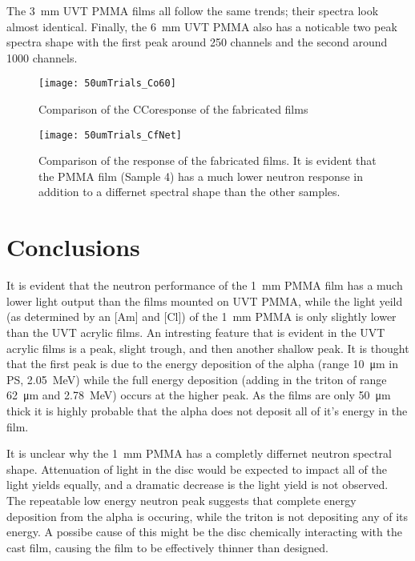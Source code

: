 \documentclass[draftcls,onecolumn]{IEEEtran}
\begin{document}
The \SI{3}{\mm} UVT PMMA films all follow the same trends; their spectra look almost identical.
Finally, the \SI{6}{\mm} UVT PMMA also has a noticable two peak spectra shape with the first peak around 250 channels and the second around 1000 channels.
\begin{figure}[ht]
  \centering
  \texttt{[image: 50umTrials\_Co60]}
  \caption[Fabricated Film Comparison (Gamma)]{Comparison of the \iso[60]C{Co}response of the fabricated films}
  \label{fig:CompCo60}
\end{figure}
\begin{figure}[ht]
  \centering
  \texttt{[image: 50umTrials\_CfNet]}
  \caption[Fabricated Film Comparison (Neutron)]{Comparison of the  response of the fabricated films. It is evident that the PMMA film (Sample 4) has a much lower neutron response in addition to a differnet spectral shape than the other samples.}
  \label{fig:CompCf252}
\end{figure}
\section{Conclusions}
It is evident that the neutron performance of the \SI{1}{\mm} PMMA film has a much lower light output than the films mounted on UVT PMMA, while the light yeild (as determined by an [Am] and [Cl]) of the \SI{1}{\mm} PMMA is only slightly lower than the UVT acrylic films.
An intresting feature that is evident in the UVT acrylic films is a peak, slight trough, and then another shallow peak.
It is thought that the first peak is due to the energy deposition of the alpha (range \SI{10}{\um} in PS, \SI{2.05}{\MeV}) while the full energy deposition (adding in the triton of range \SI{62}{\um} and \SI{2.78}{\MeV}) occurs at the higher peak.
As the films are only \SI{50}{\um} thick it is highly probable that the alpha does not deposit all of it's energy in the film.

It is unclear why the \SI{1}{\mm} PMMA has a completly differnet neutron spectral shape.
Attenuation of light in the disc would be expected to impact all of the light yields equally, and a dramatic decrease is the light yield is not observed.
The repeatable low energy neutron peak suggests that complete energy deposition from the alpha is occuring, while the triton is not depositing any of its energy.
A possibe cause of this might be the disc chemically interacting with the cast film, causing the film to be effectively thinner than designed.
\end{document}
